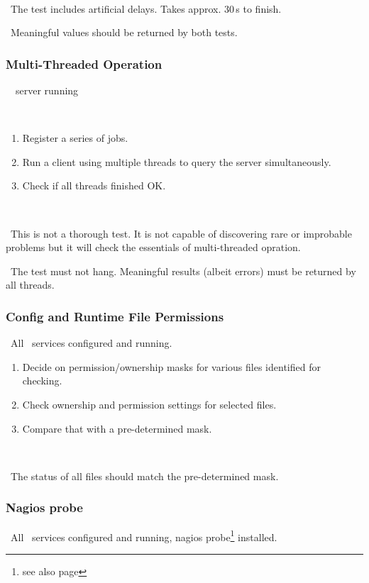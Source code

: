 \how\ 

\note\ The test includes artificial delays. Takes approx. 30\,s to finish.

\result\ Meaningful values should be returned by both tests. 

\subsubsection{Multi-Threaded Operation}

\req\ \LB\ server running

\what\
\begin{enumerate}
\item Register a series of jobs.
\item Run a client using multiple threads to query the server simultaneously.
\item Check if all threads finished OK.
\end{enumerate}

\how\ 

\note\ This is not a thorough test. It is not capable of discovering rare or improbable problems but it will check the essentials of multi-threaded opration.

\result\ The test must not hang. Meaningful results (albeit errors) must be returned by all threads.

\subsubsection{Config and Runtime File Permissions}
\label{permissions}
\req\ All \LB\ services configured and running.

\what
\begin{enumerate}
\item Decide on permission/ownership masks for various files identified for checking.
\item Check ownership and permission settings for selected files.
\item Compare that with a pre-determined mask.
\end{enumerate}

\how\ 

\result\ The status of all files should match the pre-determined mask.


\subsubsection{Nagios probe}
\label{permissions}
\req\ All \LB\ services configured and running, nagios probe\footnote{see also page \pageref{s:nagios}} installed.

